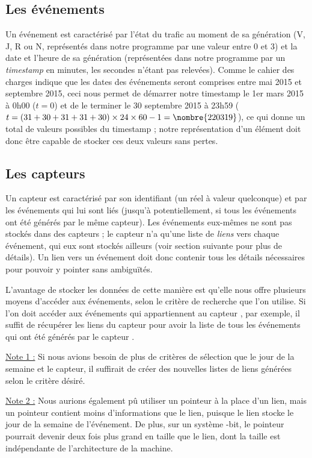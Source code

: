 \documentclass[11pt,a4paper]{article}
\begin{document}
\subsection{Les événements}

Un événement est caractérisé par l'état du trafic au moment de sa génération (V, J, R ou N, représentés dans notre programme par une valeur entre 0 et 3) et la date et l'heure de sa génération (représentées dans notre programme par un \textit{timestamp} en minutes, les secondes n'étant pas relevées). Comme le cahier des charges indique que les dates des événements seront comprises entre mai 2015 et septembre 2015, ceci nous permet de démarrer notre timestamp le 1er mars 2015 à 0h00 ($t = 0$) et de le terminer le 30 septembre 2015 à 23h59 ($ t = (31 + 30 + 31 + 31 + 30) \times 24 \times 60 - 1 = \nombre{220319} $), ce qui donne un total de  valeurs possibles du timestamp ; notre représentation d'un élément doit donc être capable de stocker ces deux valeurs sans pertes.

\subsection{Les capteurs}

Un capteur est caractérisé par son identifiant (un réel à valeur quelconque) et par les événements qui lui sont liés (jusqu'à  potentiellement, si tous les événements ont été générés par le même capteur). Les événements eux-mêmes ne sont pas stockés dans des capteurs ; le capteur n'a qu'une liste de \textit{liens} vers chaque événement, qui eux sont stockés ailleurs (voir section suivante pour plus de détails). Un lien vers un événement doit donc contenir tous les détails nécessaires pour pouvoir y pointer sans ambiguïtés.

L'avantage de stocker les données de cette manière est qu'elle nous offre plusieurs moyens d'accéder aux événements, selon le critère de recherche que l'on utilise. Si l'on doit accéder aux événements qui appartiennent au capteur , par exemple, il suffit de récupérer les liens du capteur  pour avoir la liste de tous les événements qui ont été générés par le capteur .

\underline{Note 1 :} Si nous avions besoin de plus de critères de sélection que le jour de la semaine et le capteur, il suffirait de créer des nouvelles listes de liens générées selon le critère désiré.

\underline{Note 2 :} Nous aurions également pû utiliser un pointeur à la place d'un lien, mais un pointeur contient moins d'informations que le lien, puisque le lien stocke le jour de la semaine de l'événement. De plus, sur un système -bit, le pointeur pourrait devenir deux fois plus grand en taille que le lien, dont la taille est indépendante de l'architecture de la machine.
\end{document}
